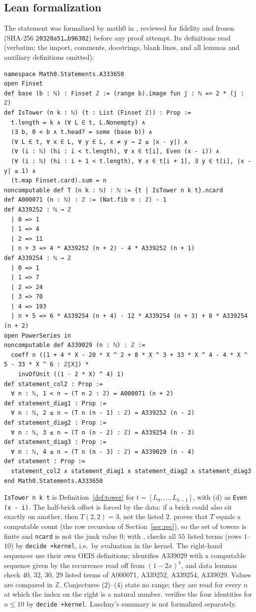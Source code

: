 \documentclass[11pt]{amsart}
\theoremstyle{plain}
\theoremstyle{definition}
\newcommand{\Z}{\mathbb{Z}}
\begin{document}
\subsection*{Lean formalization}
The statement was formalized by math0 in , reviewed for fidelity and frozen (SHA-256 \texttt{20320a51\ldots b96302}) before any proof attempt. Its definitions read (verbatim; the import, comments, docstrings, blank lines, and all lemmas and auxiliary definitions omitted):
\begin{lstlisting}[basicstyle=\ttfamily\scriptsize]
namespace Math0.Statements.A333650
open Finset
def base (b : ℕ) : Finset ℤ := (range b).image fun j : ℕ => 2 * (j : ℤ)
def IsTower (n k : ℕ) (t : List (Finset ℤ)) : Prop :=
  t.length = k ∧ (∀ L ∈ t, L.Nonempty) ∧
  (∃ b, 0 < b ∧ t.head? = some (base b)) ∧
  (∀ L ∈ t, ∀ x ∈ L, ∀ y ∈ L, x ≠ y → 2 ≤ |x - y|) ∧
  (∀ (i : ℕ) (hi : i < t.length), ∀ x ∈ t[i], Even (x - i)) ∧
  (∀ (i : ℕ) (hi : i + 1 < t.length), ∀ x ∈ t[i + 1], ∃ y ∈ t[i], |x - y| ≤ 1) ∧
  (t.map Finset.card).sum = n
noncomputable def T (n k : ℕ) : ℕ := {t | IsTower n k t}.ncard
def A000071 (n : ℕ) : ℤ := (Nat.fib n : ℤ) - 1
def A339252 : ℕ → ℤ
  | 0 => 1
  | 1 => 4
  | 2 => 11
  | n + 3 => 4 * A339252 (n + 2) - 4 * A339252 (n + 1)
def A339254 : ℕ → ℤ
  | 0 => 1
  | 1 => 7
  | 2 => 24
  | 3 => 70
  | 4 => 193
  | n + 5 => 6 * A339254 (n + 4) - 12 * A339254 (n + 3) + 8 * A339254 (n + 2)
open PowerSeries in
noncomputable def A339029 (n : ℕ) : ℤ :=
  coeff n ((1 + 4 * X - 20 * X ^ 2 + 8 * X ^ 3 + 33 * X ^ 4 - 4 * X ^ 5 - 33 * X ^ 6 : ℤ⟦X⟧) *
    invOfUnit ((1 - 2 * X) ^ 4) 1)
def statement_col2 : Prop :=
  ∀ n : ℕ, 1 < n → (T n 2 : ℤ) = A000071 (n + 2)
def statement_diag1 : Prop :=
  ∀ n : ℕ, 2 ≤ n → (T n (n - 1) : ℤ) = A339252 (n - 2)
def statement_diag2 : Prop :=
  ∀ n : ℕ, 3 ≤ n → (T n (n - 2) : ℤ) = A339254 (n - 3)
def statement_diag3 : Prop :=
  ∀ n : ℕ, 4 ≤ n → (T n (n - 3) : ℤ) = A339029 (n - 4)
def statement : Prop :=
  statement_col2 ∧ statement_diag1 ∧ statement_diag2 ∧ statement_diag3
end Math0.Statements.A333650
\end{lstlisting}
\texttt{IsTower n k t} is Definition~\ref{def:tower} for $t=[L_0,\dots,L_{k-1}]$, with (d) as \texttt{Even (x - i)}.
The half-brick offset is forced by the data: if a brick could also sit exactly on another, then $T(2,2)=3$, not the listed $2$.
 proves that $T$ equals a computable count  (the row recursion of Section~\ref{sec:rec}), so the set of towers is finite and \texttt{ncard} is not the junk value $0$; with ,  checks all $55$ listed terms (rows $1$--$10$) by \texttt{decide +kernel}, i.e.\ by evaluation in the kernel.
The right-hand sequences use their own OEIS definitions;  identifies A339029 with a computable sequence  given by the recurrence read off from $(1-2x)^4$, and data lemmas check $40$, $32$, $30$, $29$ listed terms of A000071, A339252, A339254, A339029.
Values are compared in $\Z$. Conjectures (2)--(4) state no range; they are read for every $n$ at which the index on the right is a natural number.  verifies the four identities for $n\le10$ by \texttt{decide +kernel}. Luschny's summary is not formalized separately.
\end{document}

